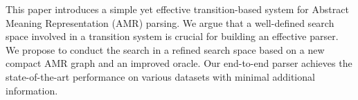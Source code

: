 This paper introduces a simple yet effective transition-based system for Abstract Meaning Representation (AMR) parsing. We argue that a well-defined search space involved in a transition system is crucial for building an effective parser. We propose to conduct the search in a refined search space based on a new compact AMR graph and an improved oracle. Our end-to-end parser achieves the state-of-the-art performance on various datasets with minimal additional information.
